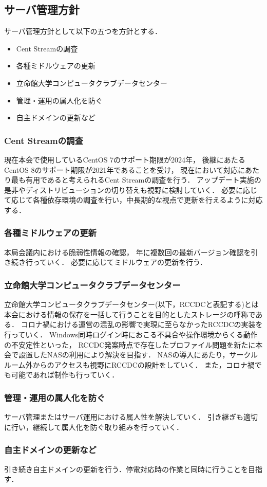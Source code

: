 \subsection*{サーバ管理方針}


サーバ管理方針として以下の五つを方針とする．
\begin{itemize}
    \item Cent Streamの調査
    \item 各種ミドルウェアの更新
    \item 立命館大学コンピュータクラブデータセンター
    \item 管理・運用の属人化を防ぐ
    \item 自主ドメインの更新など
\end{itemize}

\subsubsection*{Cent Streamの調査}
現在本会で使用しているCentOS 7のサポート期限が2024年，
後継にあたるCentOS 8のサポート期限が2021年であることを受け，
現在において対応にあたり最も有用であると考えられるCent Streamの調査を行う．
アップデート実施の是非やディストリビューションの切り替えも視野に検討していく．
必要に応じて応じて各種依存環境の調査を行い，中長期的な視点で更新を行えるように対応する．

\subsubsection*{各種ミドルウェアの更新}
本局会議内における脆弱性情報の確認，
年に複数回の最新バージョン確認を引き続き行っていく．
必要に応じてミドルウェアの更新を行う．

\subsubsection*{立命館大学コンピュータクラブデータセンター}
立命館大学コンピュータクラブデータセンター(以下，RCCDCと表記する)とは本会における情報の保存を一括して行うことを目的としたストレージの呼称である．
コロナ禍における運営の混乱の影響で実現に至らなかったRCCDCの実装を行っていく．
Windows同時ログイン時におこる不具合や操作環境からくる動作の不安定性といった，
RCCDC発案時点で存在したプロファイル問題を新たに本会で設置したNASの利用により解決を目指す．
NASの導入にあたり，サークルルーム外からのアクセスも視野にRCCDCの設計をしていく．
また，コロナ禍でも可能であれば制作も行っていく．

\subsubsection*{管理・運用の属人化を防ぐ}
サーバ管理またはサーバ運用における属人性を解決していく．
引き継ぎも適切に行い，継続して属人化を防ぐ取り組みを行っていく．

\subsubsection*{自主ドメインの更新など}
引き続き自主ドメインの更新を行う．停電対応時の作業と同時に行うことを目指す．